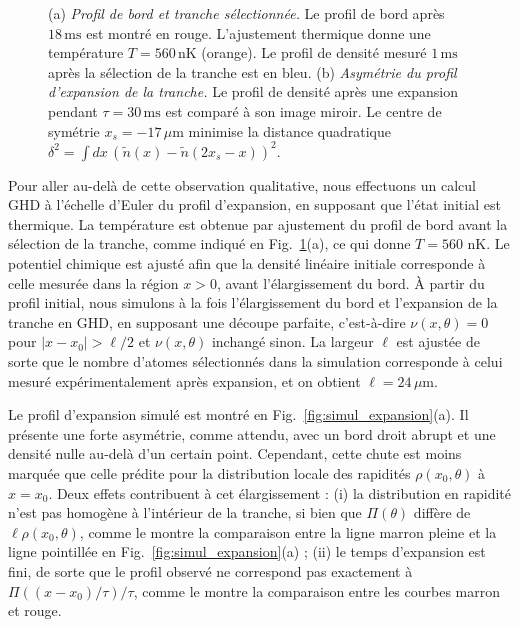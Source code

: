 \begin{figure}[!htb]
\centering
{}
\caption{(a) {\it Profil de bord et tranche sélectionnée.} Le profil de bord après $18\,\mathrm{ms}$ est montré en rouge. L'ajustement thermique donne une température $T = 560\,\mathrm{nK}$ (orange). Le profil de densité mesuré $1\,\mathrm{ms}$ après la sélection de la tranche est en bleu. (b) {\it Asymétrie du profil d’expansion de la tranche.} Le profil de densité après une expansion pendant $\tau = 30\,\mathrm{ms}$ est comparé à son image miroir. Le centre de symétrie $x_s = -17\,\mu$m minimise la distance quadratique $\delta^2 = \int dx\, (\tilde{n}(x) - \tilde{n}(2x_s - x))^2$.}
\label{fig:simul_deformation}
\end{figure}

Pour aller au-delà de cette observation qualitative, nous effectuons un calcul GHD à l’échelle d’Euler du profil d’expansion, en supposant que l’état initial est thermique.  
La température est obtenue par ajustement du profil de bord avant la sélection de la tranche, comme indiqué en Fig.~\ref{fig:simul_deformation}(a), ce qui donne $T = 560$ nK.  
Le potentiel chimique est ajusté afin que la densité linéaire initiale corresponde à celle mesurée dans la région $x > 0$, avant l’élargissement du bord.  
À partir du profil initial, nous simulons à la fois l’élargissement du bord et l’expansion de la tranche en GHD, en supposant une découpe parfaite, c’est-à-dire $\nu(x,\theta) = 0$ pour $|x - x_0| > \ell/2$ et $\nu(x,\theta)$ inchangé sinon.  
La largeur $\ell$ est ajustée de sorte que le nombre d’atomes sélectionnés dans la simulation corresponde à celui mesuré expérimentalement après expansion, et on obtient $\ell = 24\,\mu$m.  

Le profil d’expansion simulé est montré en Fig.~\ref{fig:simul_expansion}(a).  
Il présente une forte asymétrie, comme attendu, avec un bord droit abrupt et une densité nulle au-delà d’un certain point.  
Cependant, cette chute est moins marquée que celle prédite pour la distribution locale des rapidités $\rho(x_0,\theta)$ à $x = x_0$. Deux effets contribuent à cet élargissement :  
(i) la distribution en rapidité n’est pas homogène à l’intérieur de la tranche, si bien que $\Pi(\theta)$ diffère de $\ell \rho(x_0,\theta)$, comme le montre la comparaison entre la ligne marron pleine et la ligne pointillée en Fig.~\ref{fig:simul_expansion}(a) ;  
(ii) le temps d’expansion est fini, de sorte que le profil observé ne correspond pas exactement à $\Pi((x-x_0)/\tau)/\tau$, comme le montre la comparaison entre les courbes marron et rouge.

